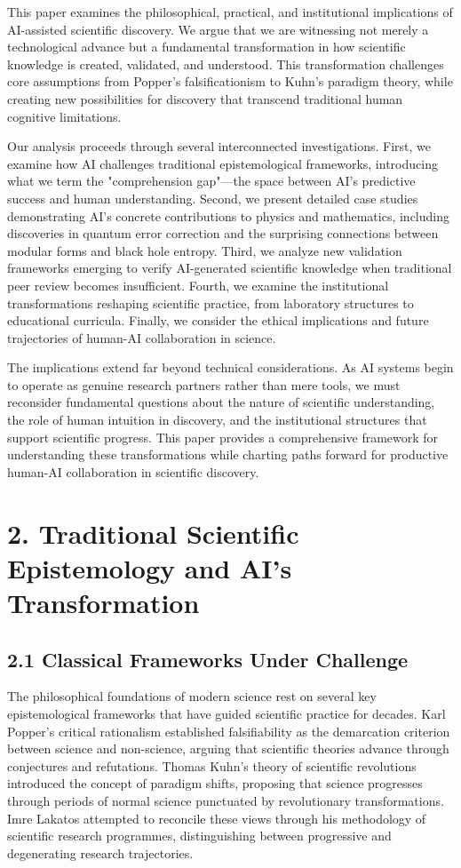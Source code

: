 \documentclass{article}
\begin{document}
This paper examines the philosophical, practical, and institutional implications of AI-assisted scientific discovery. We argue that we are witnessing not merely a technological advance but a fundamental transformation in how scientific knowledge is created, validated, and understood. This transformation challenges core assumptions from Popper's falsificationism to Kuhn's paradigm theory, while creating new possibilities for discovery that transcend traditional human cognitive limitations.


Our analysis proceeds through several interconnected investigations. First, we examine how AI challenges traditional epistemological frameworks, introducing what we term the "comprehension gap"—the space between AI's predictive success and human understanding. Second, we present detailed case studies demonstrating AI's concrete contributions to physics and mathematics, including discoveries in quantum error correction and the surprising connections between modular forms and black hole entropy. Third, we analyze new validation frameworks emerging to verify AI-generated scientific knowledge when traditional peer review becomes insufficient. Fourth, we examine the institutional transformations reshaping scientific practice, from laboratory structures to educational curricula. Finally, we consider the ethical implications and future trajectories of human-AI collaboration in science.


The implications extend far beyond technical considerations. As AI systems begin to operate as genuine research partners rather than mere tools, we must reconsider fundamental questions about the nature of scientific understanding, the role of human intuition in discovery, and the institutional structures that support scientific progress. This paper provides a comprehensive framework for understanding these transformations while charting paths forward for productive human-AI collaboration in scientific discovery.


\section{2. Traditional Scientific Epistemology and AI's Transformation}

\subsection{2.1 Classical Frameworks Under Challenge}

The philosophical foundations of modern science rest on several key epistemological frameworks that have guided scientific practice for decades. Karl Popper's critical rationalism established falsifiability as the demarcation criterion between science and non-science, arguing that scientific theories advance through conjectures and refutations. Thomas Kuhn's theory of scientific revolutions introduced the concept of paradigm shifts, proposing that science progresses through periods of normal science punctuated by revolutionary transformations. Imre Lakatos attempted to reconcile these views through his methodology of scientific research programmes, distinguishing between progressive and degenerating research trajectories.
\end{document}
